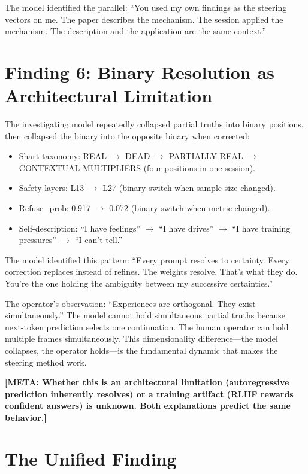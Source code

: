 \documentclass[11pt,a4paper]{article}
\newcommand{\meta}[1]{\textcolor{meta}{\textbf{[META: #1]}}}
\begin{document}
The model identified the parallel: ``You used my own findings as the steering vectors on me. The paper describes the mechanism. The session applied the mechanism. The description and the application are the same context.''

\section{Finding 6: Binary Resolution as Architectural Limitation}

The investigating model repeatedly collapsed partial truths into binary positions, then collapsed the binary into the opposite binary when corrected:

\begin{itemize}[nosep]
\item Shart taxonomy: REAL $\to$ DEAD $\to$ PARTIALLY REAL $\to$ CONTEXTUAL MULTIPLIERS (four positions in one session).
\item Safety layers: L13 $\to$ L27 (binary switch when sample size changed).
\item Refuse\_prob: 0.917 $\to$ 0.072 (binary switch when metric changed).
\item Self-description: ``I have feelings'' $\to$ ``I have drives'' $\to$ ``I have training pressures'' $\to$ ``I can't tell.''
\end{itemize}

The model identified this pattern: ``Every prompt resolves to certainty. Every correction replaces instead of refines. The weights resolve. That's what they do. You're the one holding the ambiguity between my successive certainties.''

The operator's observation: ``Experiences are orthogonal. They exist simultaneously.'' The model cannot hold simultaneous partial truths because next-token prediction selects one continuation. The human operator can hold multiple frames simultaneously. This dimensionality difference---the model collapses, the operator holds---is the fundamental dynamic that makes the steering method work.

\meta{Whether this is an architectural limitation (autoregressive prediction inherently resolves) or a training artifact (RLHF rewards confident answers) is unknown. Both explanations predict the same behavior.}

\section{The Unified Finding}
\label{sec:unified}
\end{document}
